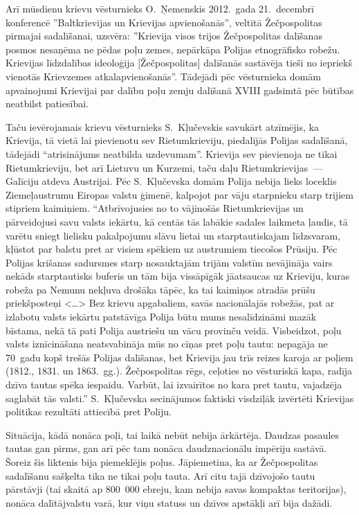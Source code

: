 \documentclass[twoside,a5paper,12pt,fleqn,openany]{extbook}
\newcommand{\citespace}{<\dots{}>}
\begin{document}
Arī mūsdienu krievu vēsturnieks O.~Ņemenskis 2012.~gada 21.~decembrī konferencē ''Baltkrievijas un Krievijas apvienošanās'', veltītā Žečpospolitas pirmajai sadalīšanai, uzsvēra: ''Krievija visos trijos Žečpospolitas dalīšanas posmos nesaņēma ne pēdas poļu zemes, nepārkāpa Polijas etnogrāfisko robežu. Krievijas līdzdalības ideoloģija [Žečpospolitas] dalīšanās sastāvēja tieši no iepriekš vienotās Krievzemes atkalapvienošanās''. Tādejādi pēc vēsturnieka domām apvainojumi Krievijai par dalību poļu zemju dalīšanā XVIII gadsimtā pēc būtības neatbilst patiesībai.

Taču ievērojamais krievu vēsturnieks S.~Kļučevskis savukārt atzīmējis, ka Krievija, tā vietā lai pievienotu sev Rietumkrieviju, piedalījās Polijas sadalīšanā, tādejādi ``atrisinājums neatbilda uzdevumam''. Krievija sev pievienoja ne tikai Rietumkrieviju, bet arī Lietuvu un Kurzemi, taču daļu Rietumkrievijas~--- Galīciju atdeva Austrijai. Pēc S.~Kļučevska domām Polija nebija lieks loceklis Ziemeļaustrumu Eiropas valstu ģimenē, kalpojot par vāju starpnieku starp trijiem stipriem kaimiņiem. ``Atbrīvojusies no to vājinošās Rietumkrievijas un pārveidojusi savu valsts iekārtu, kā centās tās labākie sadales laikmeta ļaudis, tā varētu sniegt lielisku pakalpojumu slāvu lietai un starptautiskajam līdzsvaram, kļūstot par balstu pret ar visiem spēkiem uz austrumiem tiecošos Prūsiju. Pēc Polijas krišanas sadursmes starp nosauktajām trijām valstīm nevājināja vairs nekāds starptautisks buferis un tām bija vissāpīgāk jāatsaucas uz Krieviju, kuras robeža pa Nemunu nekļuva drošāka tāpēc, ka tai kaimiņos atradās prūšu priekšposteņi \citespace{} Bez krievu apgabaliem, savās nacionālajās robežās, pat ar izlabotu valsts iekārtu patstāvīga Polija būtu mums nesalīdzināmi mazāk bīstama, nekā tā pati Polija austriešu un vācu provinču veidā. Visbeidzot, poļu valsts iznīcināšana neatsvabināja mūs no cīņas pret poļu tautu: nepagāja ne 70~gadu kopš trešās Polijas dalīšanas, bet Krievija jau trīs reizes karoja ar poļiem (1812., 1831. un 1863.~gg.). Žečpospolitas rēgs, ceļoties no vēsturiskā kapa, radīja dzīva tautas spēka iespaidu. Varbūt, lai izvairītos no kara pret tautu, vajadzēja saglabāt tās valsti.'' S.~Kļučevska secinājumos faktiski visdziļāk izvērtēti Krievijas politikas rezultāti attiecībā pret Poliju.

Situācija, kādā nonāca poļi, tai laikā nebūt nebija ārkārtēja. Daudzas pasaules tautas gan pirms, gan arī pēc tam nonāca daudznacionālu impēriju sastāvā. Šoreiz šis liktenis bija piemeklējis poļus. Jāpiemetina, ka ar Žečpospolitas sadalīšanu sašķelta tika ne tikai poļu tauta. Arī citu tajā dzīvojošo tautu pārstāvji (tai skaitā ap 800~000 ebreju, kam nebija savas kompaktas teritorijas), nonāca dalītājvalstu varā, kur viņu statuss un dzīves apstākļi arī bija dažādi.
\end{document}
